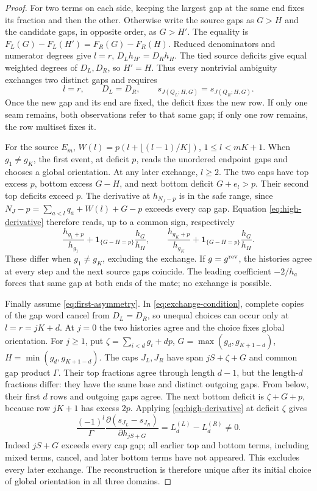 \documentclass[11pt,a4paper]{amsart}
\numberwithin{equation}{section}
\theoremstyle{plain}
\theoremstyle{definition}
\begin{document}
\begin{proof}
For two terms on each side, keeping the largest gap at the same end fixes
its fraction and then the other.  Otherwise write the source gaps as
\(G>H\) and the candidate gaps, in opposite order, as \(G>H'\).
The equality is
\(F_L(G)-F_L(H')=F_R(G)-F_R(H)\).
Reduced denominators and numerator degrees give
\(l=r\), \(D_Lh_{H'}=D_Rh_H\).  The tied source deficits
give equal weighted degrees of \(D_L,D_R\), so \(H'=H\).
Thus every nontrivial ambiguity exchanges two distinct gaps and requires
\begin{equation}\label{eq:exchange-condition}
 l=r,\qquad D_L=D_R,\qquad
 s_{J(Q_L;H,G)}=s_{J(Q_R;H,G)}.
\end{equation}
Once the new gap and its end are fixed, the deficit fixes the new row.
If only one seam remains, both observations refer to that same gap;
if only one row remains, the row multiset fixes it.

For the source \(E_m\),
\(W(l)=p(l+\lfloor(l-1)/K\rfloor)\), \(1\le l<mK+1\).
When \(g_1\ne g_K\), the first event, at deficit \(p\),
reads the unordered endpoint gaps and chooses a global orientation.
At any later exchange, \(l\ge2\).  The two caps have top
excess \(p\), bottom excess \(G-H\), and next bottom
deficit \(G+e_l>p\).  Their second top deficits exceed \(p\).
The derivative at \(h_{N_J-p}\) is in the safe range, since
\(N_J-p=\sum_{a<l}q_a+W(l)+G-p\) exceeds every cap gap.
Equation \eqref{eq:high-derivative} therefore reads, up to a common
sign, respectively
\[
 \frac{h_{g_1+p}}{h_{g_1}}
 +\mathbf1_{\{G-H=p\}}\frac{h_G}{h_H},\qquad
 \frac{h_{g_K+p}}{h_{g_K}}
 +\mathbf1_{\{G-H=p\}}\frac{h_G}{h_H}.
\]
These differ when \(g_1\ne g_K\), excluding the exchange.
If \(g=g^{\rm rev}\), the histories agree at every step and
the next source gaps coincide.  The leading coefficient \(-2/h_a\)
forces that same gap at both ends of the mate; no exchange is possible.

Finally assume \eqref{eq:first-asymmetry}.  In
\eqref{eq:exchange-condition}, complete copies of the gap word cancel
from \(D_L=D_R\), so unequal choices can occur only at
\(l=r=jK+d\).  At \(j=0\) the two histories agree and the
choice fixes global orientation.  For \(j\ge1\), put
\(\zeta=\sum_{i<d}g_i+dp\),
\(G=\max(g_d,g_{K+1-d})\), \(H=\min(g_d,g_{K+1-d})\).
The caps \(J_L,J_R\) have span \(jS+\zeta+G\) and common
gap product \(\Gamma\).  Their top fractions agree through
length \(d-1\), but the length-\(d\) fractions differ:
they have the same base and distinct outgoing gaps.  From below, their
first \(d\) rows and outgoing gaps agree.  The next bottom deficit
is \(\zeta+G+p\), because row \(jK+1\) has excess \(2p\).
Applying \eqref{eq:high-derivative} at deficit \(\zeta\) gives
\begin{equation}\label{eq:prefix-cap-target}
 \frac{(-1)^l}{\Gamma}
 \frac{\partial(s_{J_L}-s_{J_R})}{\partial h_{jS+G}}
 =L_d^{(L)}-L_d^{(R)}\ne0.
\end{equation}
Indeed \(jS+G\) exceeds every cap gap; all earlier top and bottom
terms, including mixed terms, cancel, and later bottom terms have not
appeared.  This excludes every later exchange.  The reconstruction is
therefore unique after its initial choice of global orientation in all
three domains.
\end{proof}
\end{document}
